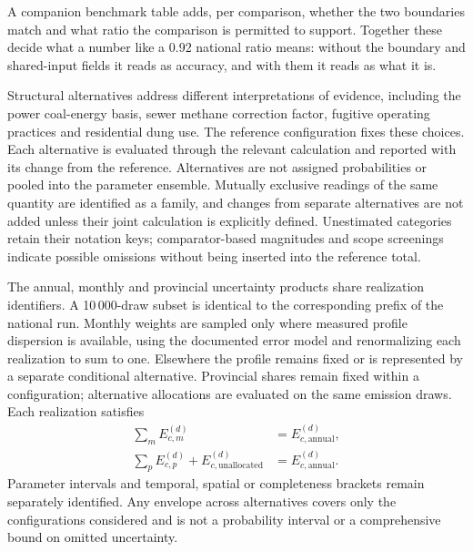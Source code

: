 \documentclass[essd]{copernicus}
\begin{document}
A companion benchmark table adds, per comparison, whether the two boundaries match and what ratio the comparison is permitted to support. Together these decide what a number like a \num{0.92} national ratio means: without the boundary and shared-input fields it reads as accuracy, and with them it reads as what it is.

Structural alternatives address different interpretations of evidence, including the power coal-energy basis, sewer methane correction factor, fugitive operating practices and residential dung use. The reference configuration fixes these choices. Each alternative is evaluated through the relevant calculation and reported with its change from the reference. Alternatives are not assigned probabilities or pooled into the parameter ensemble. Mutually exclusive readings of the same quantity are identified as a family, and changes from separate alternatives are not added unless their joint calculation is explicitly defined. Unestimated categories retain their notation keys; comparator-based magnitudes and scope screenings indicate possible omissions without being inserted into the reference total.

The annual, monthly and provincial uncertainty products share realization identifiers. A 10\,000-draw subset is identical to the corresponding prefix of the national run. Monthly weights are sampled only where measured profile dispersion is available, using the documented error model and renormalizing each realization to sum to one. Elsewhere the profile remains fixed or is represented by a separate conditional alternative. Provincial shares remain fixed within a configuration; alternative allocations are evaluated on the same emission draws. Each realization satisfies
\begin{equation}
 \begin{split}
 \sum_m E_{c,m}^{(d)}&=E_{c,\mathrm{annual}}^{(d)},\\
 \sum_p E_{c,p}^{(d)}+E_{c,\mathrm{unallocated}}^{(d)}
 &=E_{c,\mathrm{annual}}^{(d)}.
 \end{split}
 \label{eq:uncertainty_allocation}
\end{equation}
Parameter intervals and temporal, spatial or completeness brackets remain separately identified. Any envelope across alternatives covers only the configurations considered and is not a probability interval or a comprehensive bound on omitted uncertainty.
\end{document}
